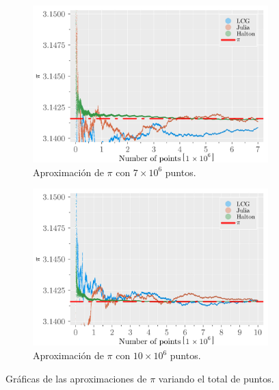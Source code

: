 \begin{enumerate}
\begin{solution}
\begin{figure}
\begin{subfigure}{0.45\textwidth}
                \includegraphics[scale=0.065]{../figures/pies_7E6.png}
                \caption{Aproximación de $\pi$ con $7 \times 10^6$ puntos.}
            \end{subfigure}
            \hfill
            \begin{subfigure}{0.45\textwidth}
                \centering
                \includegraphics[scale=0.065]{../figures/pies_10E6.png}
                \caption{Aproximación de $\pi$ con $10 \times 10^6$ puntos.}
            \end{subfigure}
            \caption{Gráficas de las aproximaciones de $\pi$ variando el total de puntos.}
            \label{fig:pi_approximations}
        \end{figure}


\end{solution}
\end{enumerate}
